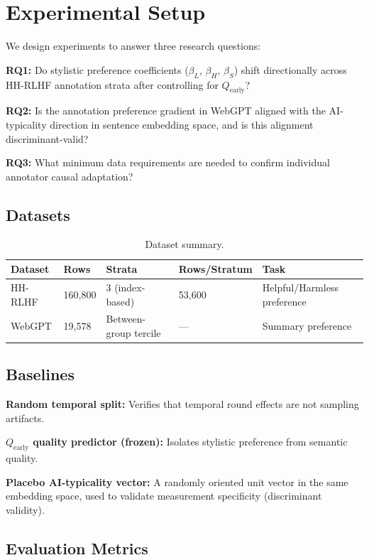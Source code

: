 \section{Experimental Setup}
\label{sec:experiments}

We design experiments to answer three research questions:

\textbf{RQ1:} Do stylistic preference coefficients ($\beta_L$, $\beta_H$, $\beta_S$) shift directionally across HH-RLHF annotation strata after controlling for $Q_\text{early}$?

\textbf{RQ2:} Is the annotation preference gradient in WebGPT aligned with the AI-typicality direction in sentence embedding space, and is this alignment discriminant-valid?

\textbf{RQ3:} What minimum data requirements are needed to confirm individual annotator causal adaptation?

\subsection{Datasets}

\begin{table}[h]
\centering
\caption{Dataset summary.}
\begin{tabular}{lllll}
\toprule
Dataset & Rows & Strata & Rows/Stratum & Task \\
\midrule
HH-RLHF & 160,800 & 3 (index-based) & 53,600 & Helpful/Harmless preference \\
WebGPT & 19,578 & Between-group tercile & --- & Summary preference \\
\bottomrule
\end{tabular}
\end{table}

\subsection{Baselines}

\textbf{Random temporal split:} Verifies that temporal round effects are not sampling artifacts.

\textbf{$Q_\text{early}$ quality predictor (frozen):} Isolates stylistic preference from semantic quality.

\textbf{Placebo AI-typicality vector:} A randomly oriented unit vector in the same embedding space, used to validate measurement specificity (discriminant validity).

\subsection{Evaluation Metrics}

